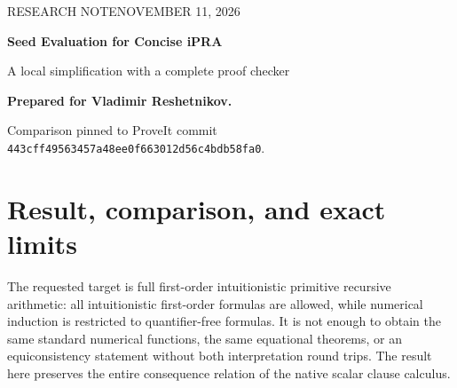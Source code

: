 \documentclass[11pt,letterpaper]{article}
\begin{document}
\thispagestyle{empty}
{\small\sffamily RESEARCH NOTE\hfill NOVEMBER 11, 2026\par}
\vspace{12pt}
{\LARGE\bfseries Seed Evaluation for Concise iPRA\par}
\vspace{5pt}
{\large A local simplification with a complete proof checker\par}
\vspace{9pt}
\textbf{Prepared for Vladimir Reshetnikov.}\par
Comparison pinned to ProveIt commit
\texttt{443cff49563457a48ee0f663012d56c4bdb58fa0}.

\begin{abstract}
The current zero-normal scalar presentation of intuitionistic primitive
recursive arithmetic uses an equality identifying a preceding iterate to
evaluate the next iterate. This note replaces that premise by equality of
the initial values:
\[
 a=b,\quad I(Sc,a;u.h)=r
 \qquad\Longrightarrow\qquad
 r=h\langle I(c,b;u.h)\rangle.
\]
Zero-counter iteration remains a syntax convention. The replacement and
the current rule derive one another using reflexivity and arithmetic
inferences alone; no induction or logical rule is needed for that
equivalence. The complete calculus still has five schemes. It retains the
same numerical terms, formulas, scopes, and normalized substitution, so the
whole-domain bi-interpretation with full first-order iPRA is preserved.
The checker and proof-certificate comparisons are deliberately modest:
the rule change ties the original implementation in one direct comparison
and saves two normalized bytes and two tokens in a second matched
implementation. Its standard computation certificates omit one repeated
predecessor iterator. This is a verified local improvement, not a proof of
absolute simplicity or a new compact-checker record.
\end{abstract}

\section{Result, comparison, and exact limits}

The requested target is full first-order intuitionistic primitive recursive
arithmetic: all intuitionistic first-order formulas are allowed, while
numerical induction is restricted to quantifier-free formulas. It is not
enough to obtain the same standard numerical functions, the same equational
theorems, or an equiconsistency statement without both interpretation round
trips. The result here preserves the entire consequence relation of the
native scalar clause calculus.
\end{document}
